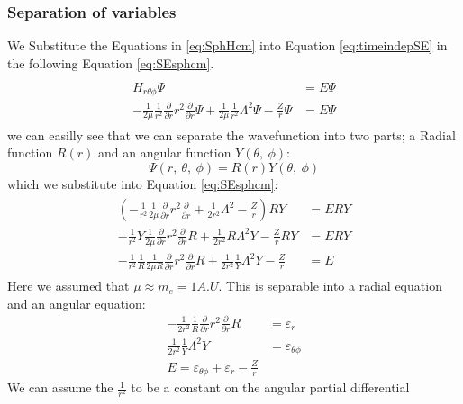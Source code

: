 \documentclass[../master_thesis.tex]{subfiles}
\begin{document}
\subsubsection{Separation of variables}
We Substitute the Equations in \ref{eq:SphHcm} into Equation \ref{eq:timeindepSE}
in the following Equation \ref{eq:SEsphcm}.
\begin{align}\label{eq:SEsphcm}
  \begin{split}
    \hat{H}_{r\theta\phi}\Psi &= E\Psi \\
    -\frac{1}{2\mu}\frac{1}{r^2}\frac{\partial}{\partial r}
          r^2\frac{\partial}{\partial r}\Psi+\frac{1}{2\mu}\frac{1}{r^2}\Lambda^2\Psi-
          \frac{Z}{r}\Psi &= E\Psi
  \end{split}
\end{align}
we can easilly see that we can separate the wavefunction into two parts; a Radial
function $R(r)$ and an angular function $Y(\theta, \ \phi)$:
$$\Psi(r, \ \theta, \ \phi) = R(r)Y(\theta, \ \phi)$$ which we substitute into
Equation \ref{eq:SEsphcm}:
\begin{align}
  \begin{split}
    \left(-\frac{1}{r^2}\frac{1}{2\mu}\frac{\partial}{\partial r}r^2\frac{\partial}{\partial r}+\frac{1}{2r^2}\Lambda^2- \frac{Z}{r}\right)RY &= ERY \\
    -\frac{1}{r^2}Y\frac{1}{2\mu}\frac{\partial}{\partial r}r^2\frac{\partial}{\partial r}R + \frac{1}{2r^2}R\Lambda^2Y - \frac{Z}{r} RY &= ERY \\
    -\frac{1}{r^2}\frac{1}{R}\frac{1}{2\mu R}\frac{\partial}{\partial r}r^2\frac{\partial}{\partial r}R + \frac{1}{2r^2}\frac{1}{Y}\Lambda^2Y - \frac{Z}{r} &= E
  \end{split}
\end{align}
Here we assumed that $\mu \approx m_e = 1 A.U.$
This is separable into a radial equation and an angular equation:
\begin{subequations}
  \begin{align}
    -\frac{1}{2r^2}\frac{1}{R}\frac{\partial}{\partial r}
    r^2\frac{\partial}{\partial r}R &= \varepsilon_r \label{eq:Rpart}\\
    \frac{1}{2r^2}\frac{1}{Y}\Lambda^2Y &= \varepsilon_{\theta\phi}\label{eq:Ypart}\\
    E = \varepsilon_{\theta\phi} + \varepsilon_r  - \frac{Z}{r}
  \end{align}
\end{subequations}
We can assume the $\frac{1}{r^2}$ to be a constant on the angular partial differential
\end{document}
